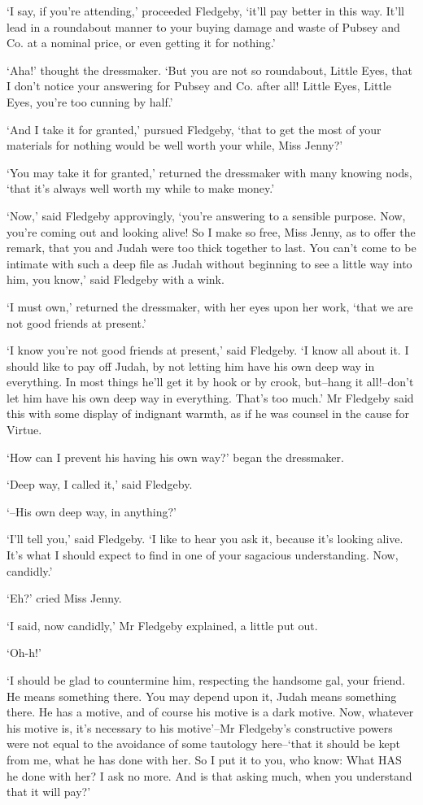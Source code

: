 ‘I say, if you’re attending,’ proceeded Fledgeby, ‘it’ll pay better in
this way. It’ll lead in a roundabout manner to your buying damage and
waste of Pubsey and Co. at a nominal price, or even getting it for
nothing.’

‘Aha!’ thought the dressmaker. ‘But you are not so roundabout, Little
Eyes, that I don’t notice your answering for Pubsey and Co. after all!
Little Eyes, Little Eyes, you’re too cunning by half.’

‘And I take it for granted,’ pursued Fledgeby, ‘that to get the most of
your materials for nothing would be well worth your while, Miss Jenny?’

‘You may take it for granted,’ returned the dressmaker with many knowing
nods, ‘that it’s always well worth my while to make money.’

‘Now,’ said Fledgeby approvingly, ‘you’re answering to a sensible
purpose. Now, you’re coming out and looking alive! So I make so free,
Miss Jenny, as to offer the remark, that you and Judah were too thick
together to last. You can’t come to be intimate with such a deep file
as Judah without beginning to see a little way into him, you know,’ said
Fledgeby with a wink.

‘I must own,’ returned the dressmaker, with her eyes upon her work,
‘that we are not good friends at present.’

‘I know you’re not good friends at present,’ said Fledgeby. ‘I know all
about it. I should like to pay off Judah, by not letting him have his
own deep way in everything. In most things he’ll get it by hook or
by crook, but--hang it all!--don’t let him have his own deep way in
everything. That’s too much.’ Mr Fledgeby said this with some display of
indignant warmth, as if he was counsel in the cause for Virtue.

‘How can I prevent his having his own way?’ began the dressmaker.

‘Deep way, I called it,’ said Fledgeby.

‘--His own deep way, in anything?’

‘I’ll tell you,’ said Fledgeby. ‘I like to hear you ask it, because
it’s looking alive. It’s what I should expect to find in one of your
sagacious understanding. Now, candidly.’

‘Eh?’ cried Miss Jenny.

‘I said, now candidly,’ Mr Fledgeby explained, a little put out.

‘Oh-h!’

‘I should be glad to countermine him, respecting the handsome gal, your
friend. He means something there. You may depend upon it, Judah means
something there. He has a motive, and of course his motive is a dark
motive. Now, whatever his motive is, it’s necessary to his motive’--Mr
Fledgeby’s constructive powers were not equal to the avoidance of some
tautology here--‘that it should be kept from me, what he has done with
her. So I put it to you, who know: What HAS he done with her? I ask no
more. And is that asking much, when you understand that it will pay?’


